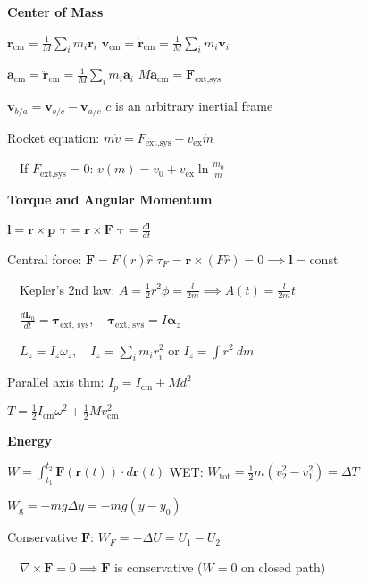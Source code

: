 \documentclass[twocolumn]{article}
\begin{document}
\textbf{Center of Mass}

$\mathbf{r}_{\text{cm}} = \frac{1}{M} \sum_i m_i \mathbf{r}_i$ \hfill $\mathbf{v}_{\text{cm}} = \dot{\mathbf{r}}_{\text{cm}} = \frac{1}{M} \sum_i m_i \mathbf{v}_i$

$\mathbf{a}_{\text{cm}} = \ddot{\mathbf{r}}_{\text{cm}} = \frac{1}{M} \sum_i m_i \mathbf{a}_i$ \hfill $M\mathbf{a}_{\text{cm}} = \mathbf{F}_{\text{ext,sys}}$

$\mathbf{v}_{b/a} = \mathbf{v}_{b/c} - \mathbf{v}_{a/c}$ \hfill $c$ is an arbitrary inertial frame

Rocket equation: $m \dot{v} = F_{\text{ext,sys}} - v_{\text{ex}} \dot{m}$

$\quad$If $F_{\text{ext,sys}} = 0$: $v(m) = v_0 + v_{\text{ex}} \ln \frac{m_0}{m}$

\dotfill

\textbf{Torque and Angular Momentum}

$\mathbf{l} = \mathbf{r} \times \mathbf{p}$ \hfill $\boldsymbol{\tau} = \mathbf{r} \times \mathbf{F}$ \hfill $\boldsymbol{\tau} = \frac{d\mathbf{l}}{dt}$

Central force: $\mathbf{F} = F(r) \hat{r}$ \hfill $\tau_F = \mathbf{r} \times (F \hat{r}) = 0 \implies \mathbf{l} = \text{const}$

$\quad$Kepler's 2nd law: $\dot{A} = \frac{1}{2} r^2 \dot{\phi} = \frac{l}{2m} \implies A(t) = \frac{l}{2m} t$

$\quad \frac{d\mathbf{L}_0}{dt} = \boldsymbol{\tau}_{\text{ext, sys}}, \quad \boldsymbol{\tau}_{\text{ext, sys}} = I \boldsymbol{\alpha}_z$

$\quad L_z = I_z \omega_z, \quad I_z = \sum_i m_i r_i^2$ or $I_z = \int r^2\ dm$

Parallel axis thm: $I_p = I_{\text{cm}} + Md^2$

$T = \frac{1}{2} I_{\text{cm}} \omega^2 + \frac{1}{2} M v_{\text{cm}}^2$

\dotfill

\textbf{Energy}

$W = \int_{t_1}^{t_2} \mathbf{F}(\mathbf{r}(t)) \cdot d\mathbf{r}(t)$ \hfill WET: $W_{\text{tot}} = \frac{1}{2} m (v_2^2 - v_1^2) = \Delta T$

$W_{\text{g}} = -mg \Delta y = -mg(y - y_0)$

Conservative $\mathbf{F}$: $W_F = -\Delta U = U_1 - U_2$

$\quad \nabla \times \mathbf{F} = 0 \implies \mathbf{F}$ is conservative ($W=0$ on closed path)
\end{document}
